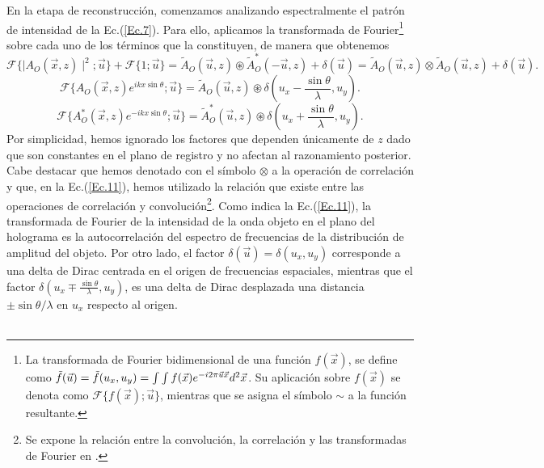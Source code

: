 \documentclass[12pt]{article}
\begin{document}
En la etapa de reconstrucción, comenzamos analizando espectralmente el patrón de intensidad de la Ec.(\ref{Ec.7}). Para ello,  aplicamos la transformada de Fourier\footnote{La transformada de Fourier bidimensional de una función $f(\Vec{x})$, se define  como  $\Tilde{f}(\Vec{u}) = \Tilde{f}(u_x,u_y) = \int \int f(\Vec{x}) e^{-i 2 \pi \Vec{u} \Vec{x}}d^2\Vec{x}$. Su aplicación sobre $f (\vec{x})$ se denota como $\mathscr{F} \{ f (\vec x); \vec{u} \}$, mientras que se asigna el símbolo $\sim$  a la función  resultante.} sobre cada uno de los términos que la constituyen, de manera que obtenemos
\begin{equation}
    \mathscr{F}\{\mid A_O (\vec{x}, z) \mid ^{2}; \vec{u}\} + \mathscr{F}\{1; \Vec{u}\} = \tilde{A}_O(\Vec{u},z) \circledast \tilde{A}_O^{*} (-\Vec{u},z)  + \delta(\Vec{u})= \tilde{A}_O(\Vec{u},z) \otimes \tilde{A}_O (\Vec{u},z) + \delta(\Vec{u}).
    \label{Ec.11}
\end{equation}
\begin{equation}
    \mathscr{F}\{A_O (\Vec{x}, z) e^{i k x \sin{\theta}}; \vec{u} \} = \tilde{A}_O(\Vec{u}, z) \circledast \delta(u_x -\frac{\sin{\theta}}{\lambda}, u_y).
\label{Ec.12}
\end{equation}
\begin{equation}
    \mathscr{F}\{A_O^{*} (\Vec{x}, z) e^{-i k x \sin{\theta}}; \vec{u} \}  = \tilde{A}^{*}_O(\Vec{u}, z) \circledast \delta(u_x + \frac{\sin{\theta}}{\lambda}, u_y).
\label{Ec.13}
\end{equation}
Por simplicidad,   hemos ignorado los factores que dependen únicamente de $z$ dado que son constantes  en el plano de registro y no afectan al razonamiento posterior. Cabe destacar que hemos denotado con el símbolo $\otimes$  a la operación de correlación y que, en la Ec.(\ref{Ec.11}), hemos utilizado la relación que existe entre las operaciones de correlación y convolución\footnote{Se expone la relación entre la convolución, la correlación y las transformadas de Fourier en \cite{12}.}. Como indica la Ec.(\ref{Ec.11}), la transformada de Fourier de la intensidad de la onda objeto en el plano del holograma es la autocorrelación del espectro de frecuencias de la distribución de amplitud del objeto.  Por otro lado, el factor $\delta(\vec{u}) = \delta(u_x,u_y)$ corresponde a  una delta de Dirac centrada en el origen de frecuencias espaciales, mientras que   el factor $ \delta(u_{x} \mp \frac{\sin{\theta}}{\lambda}, u_y)$,  es una delta de Dirac desplazada una distancia $\pm \sin{\theta}/\lambda$  en $u_x$ respecto al origen. \\ \\
\end{document}
